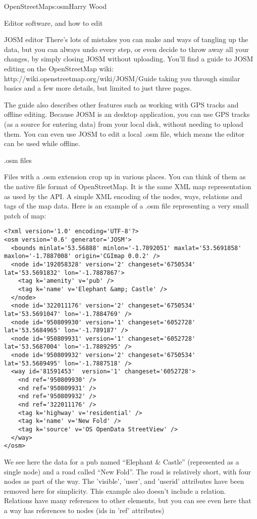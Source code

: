 \begin{aosachapter}{OpenStreetMap}{s:osm}{Harry Wood}
\begin{aosasect1}{Editor software, and how to edit}
\begin{aosasect2}{JOSM editor}
There's lots of mistakes you can make and ways of tangling up the
data, but you can always undo every step, or even decide to throw away
all your changes, by simply closing JOSM without uploading. You'll
find a guide to JOSM editing on the OpenStreetMap wiki:
http://wiki.openstreetmap.org/wiki/JOSM/Guide taking you through
similar basics and a few more details, but limited to just three
pages.

The guide also describes other features such as working with GPS
tracks and offline editing. Because JOSM is an desktop application,
you can use GPS tracks (as a source for entering data) from your local
disk, without needing to upload them. You can even use JOSM to edit a
local .osm file, which means the editor can be used while offline.

\end{aosasect2}

\begin{aosasect2}{.osm files}

Files with a .osm extension crop up in various places. You can think
of them as the native file format of OpenStreetMap. It is the same XML
map representation as used by the API. A simple XML encoding of the
nodes, ways, relations and tags of the map data. Here is an example of
a .osm file representing a very small patch of map:

\begin{verbatim}
<?xml version='1.0' encoding='UTF-8'?>
<osm version='0.6' generator='JOSM'>
  <bounds minlat='53.56888' minlon='-1.7892051' maxlat='53.5691858' maxlon='-1.7887008' origin='CGImap 0.0.2' />
  <node id='192058328' version='2' changeset='6750534' lat='53.5691832' lon='-1.7887867'>
    <tag k='amenity' v='pub' />
    <tag k='name' v='Elephant &amp; Castle' />
  </node>
  <node id='322011176' version='2' changeset='6750534' lat='53.5691047' lon='-1.7884769' />
  <node id='950809930' version='1' changeset='6052728' lat='53.5684965' lon='-1.789187' />
  <node id='950809931' version='1' changeset='6052728' lat='53.5687004' lon='-1.7889295' />
  <node id='950809932' version='2' changeset='6750534' lat='53.5689495' lon='-1.7887518' />
  <way id='81591453'  version='1' changeset='6052728'>
    <nd ref='950809930' />
    <nd ref='950809931' />
    <nd ref='950809932' />
    <nd ref='322011176' />
    <tag k='highway' v='residential' />
    <tag k='name' v='New Fold' />
    <tag k='source' v='OS OpenData StreetView' />
  </way>
</osm>
\end{verbatim}

We see here the data for a pub named ``Elephant \& Castle''
(represented as a single node) and a road called ``New Fold''. The
road is relatively short, with four nodes as part of the way. The
'visible', 'user', and 'userid' attributes have been removed here for
simplicity. This example also doesn't include a relation. Relations
have many references to other elements, but you can see even here that
a way has references to nodes (ids in 'ref' attributes)


\end{aosasect2}
\end{aosasect1}
\end{aosachapter}
